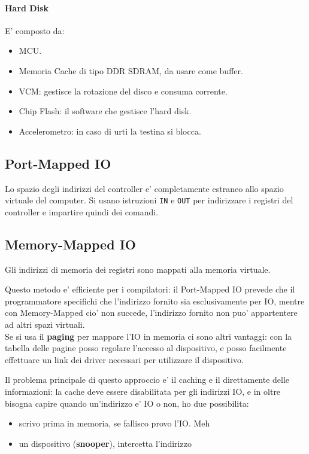 \paragraph{Hard Disk}
E' composto da:
\begin{itemize}
    \item MCU.
    \item Memoria Cache di tipo DDR SDRAM, da usare come buffer.
    \item VCM: gestisce la rotazione del disco e consuma corrente.
    \item Chip Flash: il software che gestisce l'hard disk.
    \item Accelerometro: in caso di urti la testina si blocca. 
\end{itemize}

\subsection{Port-Mapped IO}
Lo spazio degli indirizzi del controller e' completamente estraneo allo spazio virtuale
del computer. Si usano istruzioni \texttt{IN} e \texttt{OUT} per indirizzare i registri
del controller e impartire quindi dei comandi.

\subsection{Memory-Mapped IO}
Gli indirizzi di memoria dei registri sono mappati alla memoria virtuale.

Questo metodo e' efficiente per i compilatori:
il Port-Mapped IO prevede che il programmatore specifichi che l'indirizzo fornito sia esclusivamente per IO, 
mentre con Memory-Mapped cio' non succede, l'indirizzo fornito non puo' appartentere ad altri spazi virtuali. \\ 

Se si usa il \textbf{paging} per mappare l'IO in memoria ci sono altri vantaggi: 
con la tabella delle pagine posso regolare l'accesso al dispositivo, e posso facilmente
effettuare un link dei driver necessari per utilizzare il dispositivo.

Il problema principale di questo approccio e' il caching e il direttamente delle 
informazioni: la cache deve essere disabilitata per gli indirizzi IO, e in oltre 
bisogna capire quando un'indirizzo e' IO o non, ho due possibilita:
\begin{itemize}
    \item scrivo prima in memoria, se fallisco provo l'IO. Meh
    \item un dispositivo (\textbf{snooper}), intercetta l'indirizzo
\end{itemize}

